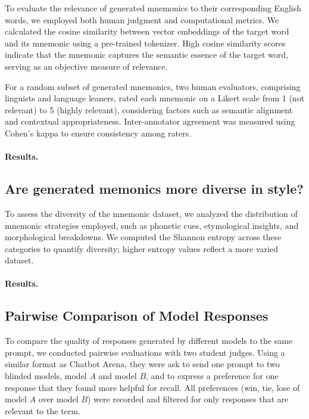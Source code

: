 \documentclass{article}
\newcounter{para}
\begin{document}
To evaluate the relevance of generated mnemonics to their corresponding English words, we employed both human judgment and computational metrics. We calculated the cosine similarity between vector embeddings of the target word and its mnemonic using a pre-trained tokenizer. High cosine similarity scores indicate that the mnemonic captures the semantic essence of the target word, serving as an objective measure of relevance.

For a random subset of generated mnemonics, two human evaluators, comprising linguists and language leaners, rated each mnemonic on a Likert scale from 1 (not relevant) to 5 (highly relevant), considering factors such as semantic alignment and contextual appropriateness. Inter-annotator agreement was measured using Cohen's kappa to ensure consistency among raters.

\paragraph{Results.}

\subsection{Are generated memonics more diverse in style?} \label{sec:diverse-style}

To assess the diversity of the mnemonic dataset, we analyzed the distribution of mnemonic strategies employed, such as phonetic cues, etymological insights, and morphological breakdowns. We computed the Shannon entropy across these categories to quantify diversity; higher entropy values reflect a more varied dataset.

\paragraph{Results.}

\subsection{Pairwise Comparison of Model Responses} \label{sec:model-comparison}


To compare the quality of responses generated by different models to the same prompt, we conducted pairwise evaluations with two student judges. Using a similar format as Chatbot Arena, they were ask to send one prompt to two blinded models, model $A$ and model $B$, and to express a preference for one response that they found more helpful for recall. All preferences (win, tie, lose of model $A$ over model $B$) were recorded and filtered for only responses that are relevant to the term.
\end{document}
